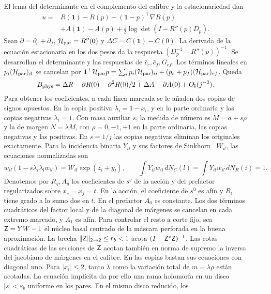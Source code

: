 El lema del determinante en el complemento del calibre y la estacionariedad dan
\begin{align*}
 u={}&R(\mathbf1)-R(p)-(\mathbf1-p)^\top\nabla R(p)\\
     &+A(\mathbf1)-A(p)+\tfrac12\log\det(I-R''(p)D_p).
\end{align*}
Sean \(\partial=\partial_e+\partial_f\), \(\mathcal H_{\rm par}=R''(0)\) y \(\Delta C=C(\mathbf1)-C(0)\).
La derivada de la ecuación estacionaria en los dos pesos da la respuesta
\((D_p^{-1}-R''(p))^{-1}\). Se desarrollan el determinante y las respuestas de
\(\hat c_e,\hat c_f,G_{ef}\). Los términos lineales en \(p_i (\mathcal H_{\rm par})_{il}\) se cancelan por
\(\mathbf1^\top \mathcal H_{\rm par}p=\sum_i p_i(\mathcal H_{\rm par})_{ii}+(p_e+p_f)(\mathcal H_{\rm
 par})_{ef}\). Queda
\[
 B_{\rm phys}=\Delta R-\partial R(0)-\partial^2 R(0)/2+\Delta A-\partial A(0)+O_b(j^{-3}).
\]
Para obtener los coeficientes, a cada línea marcada se le añaden dos copias de signos opuestos.
En la copia positiva \(\lambda_i=1-x_i\), y en la parte ordinaria y las copias negativas
\(\lambda_i=1\). Con masa auxiliar \(s\), la medida
de número es \(M=a+s\rho\) y la de margen \(N=\lambda M\), con \(\rho=0,-1,+1\) en la parte
ordinaria, las copias negativas y las positivas. En \(s=1/j\) las copias negativas eliminan
los originales exactamente. Para la incidencia binaria \(Y_{il}\) y sus factores de
Sinkhorn~\cite{sk}
\(W_{il}\), las ecuaciones normalizadas son
\[
 w_{il}(1-s\lambda_i\lambda_l w_{il})=W_{il}\exp(z_i+y_l),\qquad
 \int Y_{il}w_{il}\,dN_C(l)=\int Y_{il}w_{il}\,dN_R(i)=1 .
\]
Denotemos por \(R_q,A_q\) los coeficientes de \(s^q\) de la acción y del prefactor regularizados
sobre \(x_e=x_f=t\). En la acción, el coeficiente de \(s^0\) es afín y \(R_1\) tiene grado
a lo sumo dos en \(t\). En el prefactor \(A_0\) es constante. Los dos términos cuadráticos
del factor local y de la diagonal de márgenes se cancelan en cada extremo marcado, y \(A_1\)
es afín. Para controlar el resto a corte fijo, sea \(\mathsf Z=YW-1\) el núcleo basal centrado de
la máscara perforada en la buena aproximación. La brecha \(\|\mathsf Z\|_{2\to2}\le r_b<1\)
acota \((I-\mathsf Z^*\mathsf Z)^{-1}\). Las cotas cuadráticas de las secciones de \(\mathsf Z\) acotan
 también
en norma de supremo la inversa del jacobiano de márgenes en el calibre. En las copias bastan sus
ecuaciones con diagonal uno. Para \(|x_i|\le2\), tanto \(\lambda\) como la variación total
de \(m=\lambda\rho\) están acotadas. La ecuación implícita da por ello una rama holomorfa
en un disco \(|s|<\varepsilon_b\) uniforme en los pares. En el mismo disco reducido, los

